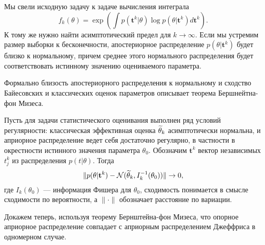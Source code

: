 Мы свели исходную задачу к задаче вычисления интеграла 
\[
f_k(\theta) = \exp \left(\int p(\mathbf{t}^k | \theta) \log p(\theta | \mathbf{t}^k) d \mathbf{t}^k \right).
\]
К тому же нужно найти асимптотический предел для $k \rightarrow \infty$.
Если мы устремим размер выборки к бесконечности,
апостериорное распределение $p(\theta| \mathbf{t}^k) $ будет близко к нормальному,
причем среднее этого нормального распределения будет соответствовать 
истинному значению оцениваемого параметра.

Формально близость апостериорного распределения к нормальному и 
сходство Байесовских и классических оценок параметров
описывает теорема Бершнейтна-фон Мизеса.

\begin{Theorem}
Пусть для задачи статистического оценивания выполнен ряд условий регулярности: классическая эффективная оценка $\widetilde{\theta}_k$ асимптотически нормальна, и априорное распределение ведет себя достаточно регулярно, в частности в окрестности истинного значения параметра $\theta_0$.
Обозначим $\mathbf{t}^k$ вектор независимых $t^k_j$ из распределения $p(t| \theta)$. Тогда
\begin{equation}
\label{eq:bvm}
\|p(\theta | \mathbf{t}^k) - \mathcal{N}(\widetilde{\theta}_k, I_k^{-1}(\theta_0))\| \rightarrow 0,
\end{equation}
где $I_k(\theta_0)$ --- информация Фишера для $\theta_0$, сходимость понимается в смысле сходимости по вероятности, а $\|\cdot\|$ обозначает расстояние по вариации.
\end{Theorem}

Докажем теперь, используя теорему Бернштейна-фон Мизеса, что опорное априорное распределение совпадает с априорным распределением Джеффриса в одномерном случае.

